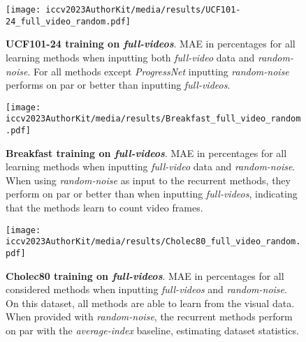 \begin{figure}
\begin{center}
   \texttt{[image: iccv2023AuthorKit/media/results/UCF101-24\_full\_video\_random.pdf]}
\end{center}
   \caption{\textbf{UCF101-24 training on \textsl{full-videos}}. 
   MAE in percentages for all learning methods when inputting both \textsl{full-video} data and \textsl{random-noise}. 
   For all methods except \textsl{ProgressNet} inputting \textsl{random-noise} performs on par or better than inputting \textsl{full-videos}.
   }
\label{fig:result_ucf_seq}
\end{figure}
\begin{figure}
\begin{center}
   \texttt{[image: iccv2023AuthorKit/media/results/Breakfast\_full\_video\_random.pdf]}
\end{center}
   \caption{\textbf{Breakfast training on \textsl{full-videos}}. 
   MAE in percentages for all learning methods when inputting \textsl{full-video} data and \textsl{random-noise}. 
   When using \textsl{random-noise} as input to the recurrent methods, they perform on par or better than when inputting \textsl{full-videos}, indicating that the methods learn to count video frames.}
\label{fig:result_breakfast_seq}
\end{figure}
\begin{figure}
\begin{center}
   \texttt{[image: iccv2023AuthorKit/media/results/Cholec80\_full\_video\_random.pdf]}
\end{center}
   \caption{\textbf{Cholec80 training on \textsl{full-videos}}. 
   MAE in percentages for all considered methods when inputting \textsl{full-videos} and \textsl{random-noise}. 
   On this dataset, all methods are able to learn from the visual data. 
   When provided with \textsl{random-noise}, the recurrent methods perform on par with the \textsl{average-index} baseline, estimating dataset statistics.}
\label{fig:result_cholec_seq}
\end{figure}

